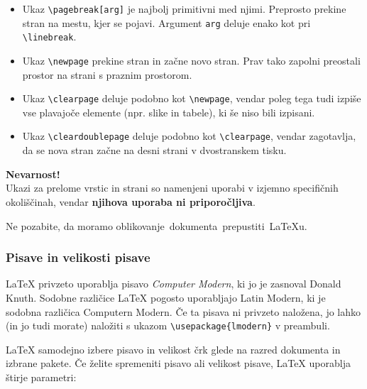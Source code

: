 \begin{itemize}
\item Ukaz \texttt{{\textbackslash}pagebreak[arg]} je najbolj primitivni med njimi. Preprosto prekine stran na mestu, kjer se pojavi. Argument \texttt{arg} deluje enako kot pri \texttt{{\textbackslash}linebreak}.
\item Ukaz \texttt{{\textbackslash}newpage} prekine stran in začne novo stran.
Prav tako zapolni preostali prostor na strani s praznim prostorom.
\item Ukaz \texttt{{\textbackslash}clearpage} deluje podobno kot \texttt{{\textbackslash}newpage}, vendar poleg tega tudi izpiše vse plavajoče elemente (npr. slike in tabele), ki še niso bili izpisani.
\item Ukaz \texttt{{\textbackslash}cleardoublepage} deluje podobno kot \texttt{{\textbackslash}clearpage}, vendar zagotavlja, da se nova stran začne na desni strani v dvostranskem tisku.
\end{itemize}

\begin{framed}
\textbf{Nevarnost!}\\
Ukazi za prelome vrstic in strani so namenjeni uporabi v izjemno specifičnih okoliščinah, vendar \textbf{njihova uporaba ni priporočljiva}.

Ne pozabite, da moramo oblikovanje~dokumenta~prepustiti~LaTeXu.
\end{framed}

\subsubsection{Pisave in velikosti pisave}\label{latexUvod_pisave}

LaTeX privzeto uporablja pisavo \textit{Computer Modern}, ki jo je zasnoval Donald Knuth.
Sodobne različice LaTeX pogosto uporabljajo Latin Modern, ki je sodobna različica Computern Modern.
Če ta pisava ni privzeto naložena, jo lahko (in jo tudi morate) naložiti s ukazom \texttt{{\textbackslash}usepackage\{lmodern\}} v preambuli.

LaTeX samodejno izbere pisavo in velikost črk glede na razred dokumenta in izbrane pakete.
Če želite spremeniti pisavo ali velikost pisave, LaTeX uporablja štirje parametri:

